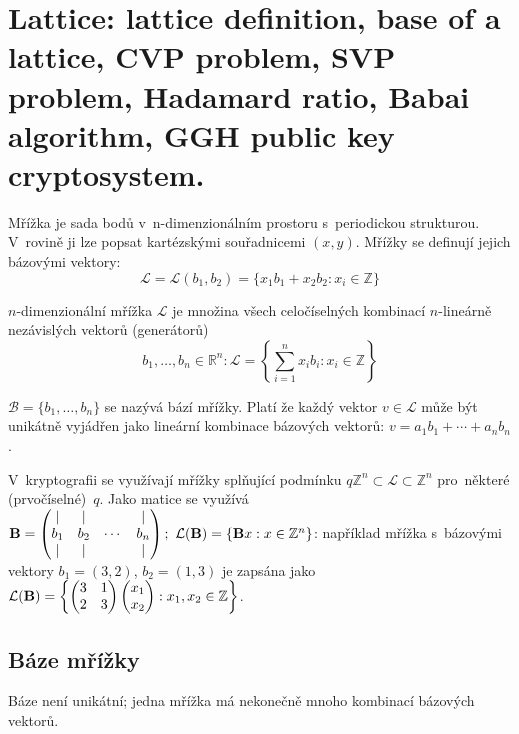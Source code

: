 \section{Lattice: lattice definition, base of a lattice, CVP problem, SVP problem, Hadamard ratio, Babai algorithm, GGH public key cryptosystem.}

\newcommand{\lat}{\ensuremath{\mathcal{L}}}
\newcommand{\base}{\ensuremath{\text{\textbf{B}}}}

Mřížka je sada bodů v~n-dimenzionálním prostoru s~periodickou strukturou.
V~rovině ji lze popsat kartézskými souřadnicemi $(x, y)$.
Mřížky se definují jejich bázovými vektory:
$$\lat = \lat(b_1, b_2) = \{x_1b_1 + x_2b_2 : x_i \in \mathbb{Z}\}$$

$n$-dimenzionální mřížka $\lat$ je množina všech celočíselných kombinací $n$-lineárně nezávislých vektorů (generátorů)
$$b_1, \dots, b_n \in \mathbb{R}^n : \lat = \left\{\sum_{i=1}^n x_ib_i : x_i \in \mathbb{Z}\right\}$$

$\mathcal{B} = \{b_1, \dots, b_n\}$ se nazývá bází mřížky.
Platí že každý vektor $v \in \lat$ může být unikátně vyjádřen jako lineární kombinace bázových vektorů: $v = a_1b_1 + \cdots + a_nb_n$.

V~kryptografii se využívají mřížky splňující podmínku $q \mathbb{Z}^n \subset \lat \subset \mathbb{Z}^n$ pro~některé (prvočíselné)~$q$.
Jako matice se využívá
$\base = \left( \begin{matrix}
| & | & {} & | \\
b_1 & b_2 & \cdots & b_n \\
| & | & {} & |
\end{matrix} \right);\ \lat(\base) = \{\base x : x \in \mathbb{Z}^n\}$:
například mřížka s~bázovými vektory
$b_1 = (3, 2)$, $b_2 = (1, 3)$
je zapsána jako
$\lat(\base) = \left\{\left(\begin{matrix}3&1\\2&3\end{matrix}\right)\left(\begin{matrix}x_1\\x_2\end{matrix}\right): x_1, x_2 \in \mathbb{Z}\right\}$.


\subsection{Báze mřížky}

Báze není unikátní; jedna mřížka má nekonečně mnoho kombinací bázových vektorů.

